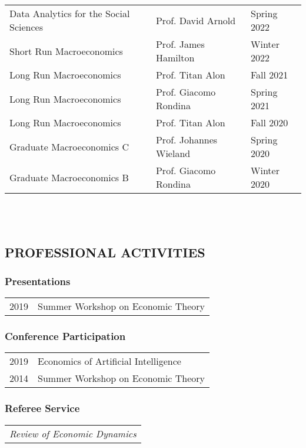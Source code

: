 \documentclass{article}
\begin{document}
\begin{tabularx}{\textwidth}{lXX}
    Data Analytics for the Social Sciences &Prof. David Arnold& Spring 2022  \\
    Short Run Macroeconomics &Prof. James Hamilton & Winter 2022 \\
    Long Run Macroeconomics  &Prof. Titan Alon & Fall 2021\\
    Long Run Macroeconomics  &Prof. Giacomo Rondina & Spring 2021\\
    Long Run Macroeconomics &Prof. Titan Alon& Fall 2020  \\
    Graduate Macroeconomics C &Prof. Johannes Wieland& Spring 2020 \\
    Graduate Macroeconomics B &Prof. Giacomo Rondina & Winter 2020\\
\end{tabularx} \\
\\

\subsection*{PROFESSIONAL ACTIVITIES}

\subsubsection*{Presentations}
\begin{tabularx}{\textwidth}{lX}
2019 & Summer Workshop on Economic Theory
\end{tabularx}

\subsubsection*{Conference Participation}
\begin{tabularx}{\textwidth}{lX}
2019 & Economics of Artificial Intelligence\\
2014 & Summer Workshop on Economic Theory\\
\end{tabularx}

\subsubsection*{Referee Service}
\begin{tabularx}{\textwidth}{l}
\textit{Review of Economic Dynamics}\\
\end{tabularx}
\end{document}
